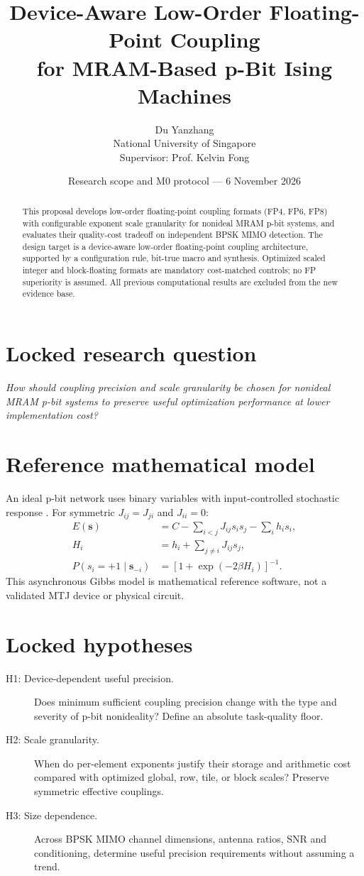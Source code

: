\documentclass[11pt,a4paper]{article}
\title{Device-Aware Low-Order Floating-Point Coupling\\for MRAM-Based p-Bit Ising Machines}
\author{Du Yanzhang\\National University of Singapore\\Supervisor: Prof. Kelvin Fong}
\date{Research scope and M0 protocol --- 6 November 2026}
\begin{document}
\maketitle
\begin{abstract}
This proposal develops low-order floating-point coupling formats (FP4, FP6, FP8) with configurable exponent scale granularity for nonideal MRAM p-bit systems, and evaluates their quality-cost tradeoff on independent BPSK MIMO detection. The design target is a device-aware low-order floating-point coupling architecture, supported by a configuration rule, bit-true macro and synthesis. Optimized scaled integer and block-floating formats are mandatory cost-matched controls; no FP superiority is assumed. All previous computational results are excluded from the new evidence base.
\end{abstract}
\section{Locked research question}
\emph{How should coupling precision and scale granularity be chosen for nonideal MRAM p-bit systems to preserve useful optimization performance at lower implementation cost?}
\section{Reference mathematical model}
An ideal p-bit network uses binary variables with input-controlled stochastic response \cite{camsari2017}. For symmetric $J_{ij}=J_{ji}$ and $J_{ii}=0$:
\begin{align}
E(\mathbf{s}) &= C-\sum_{i<j}J_{ij}s_is_j-\sum_i h_i s_i,\\
H_i &= h_i+\sum_{j\ne i}J_{ij}s_j,\\
P(s_i=+1\mid\mathbf{s}_{-i}) &= \left[1+\exp(-2\beta H_i)\right]^{-1}.
\end{align}
This asynchronous Gibbs model is mathematical reference software, not a validated MTJ device or physical circuit.
\section{Locked hypotheses}
\begin{description}
\item[H1: Device-dependent useful precision.] Does minimum sufficient coupling precision change with the type and severity of p-bit nonideality? Define an absolute task-quality floor.
\item[H2: Scale granularity.] When do per-element exponents justify their storage and arithmetic cost compared with optimized global, row, tile, or block scales? Preserve symmetric effective couplings.
\item[H3: Size dependence.] Across BPSK MIMO channel dimensions, antenna ratios, SNR and conditioning, determine useful precision requirements without assuming a trend.
\end{description}
\end{document}

